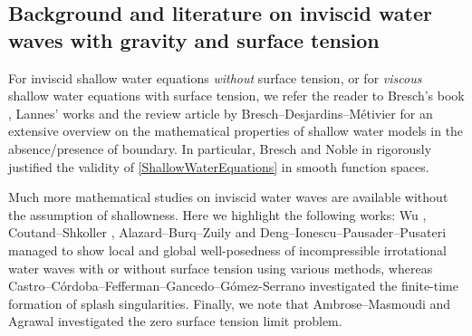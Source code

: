 \documentclass[reqno,11pt]{amsart}
\theoremstyle{plain}
\theoremstyle{definition}
\numberwithin{equation}{section}
\begin{document}
\subsection{Background and literature on inviscid water waves with gravity and surface tension} %
For inviscid shallow water equations \emph{without} surface tension, or for \emph{viscous} shallow water equations with surface tension, we refer the reader to Bresch's book \cite{Bresch}, Lannes' works \cite{LannesBook,Lannes} and the review article by Bresch--Desjardins--M{\'e}tivier \cite{BreschDesjardinsMetivier} for an extensive overview on the mathematical properties of shallow water models in the absence/presence of boundary. In particular, Bresch and Noble in \cite{BreschNoble} rigorously justified the validity of \eqref{ShallowWaterEquations} in smooth function spaces.


Much more mathematical studies on inviscid water waves are available without the assumption of shallowness. Here we highlight the following works: Wu \cite{WUI,WUII,WUIII,WUIV}, Coutand--Shkoller \cite{CoutandShkoller}, Alazard--Burq--Zuily \cite{AlazardBurqZuily1,AlazardBurqZuily2,AlazardBurqZuily3} and Deng--Ionescu--Pausader--Pusateri \cite{IonescuPusateriI,IonescuPusateriII,IonescuPusateriIII,DengIonescuPausaderPusateri} managed to show local and global well-posedness of incompressible irrotational water waves with or without surface tension using various methods, whereas Castro--C{\'o}rdoba--Fefferman--Gancedo--G{\'o}mez-Serrano \cite{Castro1,Castro2} investigated the finite-time formation of splash singularities. Finally, we note that Ambrose--Masmoudi \cite{AmbroseMasmoudi1,AmbroseMasmoudi2} and Agrawal \cite{Agrawal} investigated the zero surface tension limit problem. %
\end{document}
